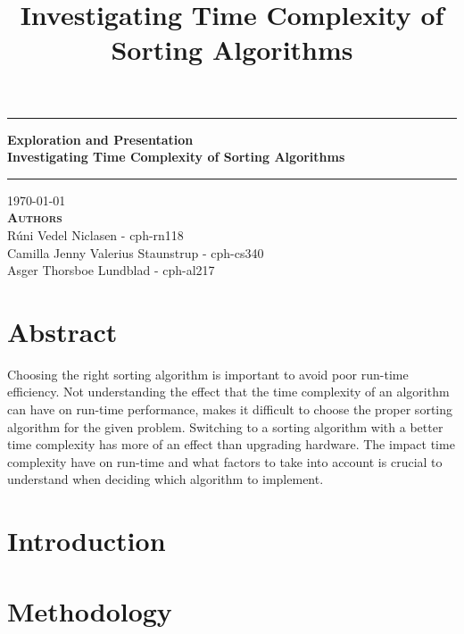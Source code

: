 \documentclass[10pt,oneside,a4paper, english]{article}
\title{Investigating Time Complexity of Sorting Algorithms}
\begin{document}
% 

\begin{center}
\hrule
\vspace{.5cm}
{ \huge \bfseries Exploration and Presentation 
\\ 
\vspace{.5cm}
Investigating Time Complexity of Sorting Algorithms} 
\vspace{.5cm}
\hrule
\vspace{1cm}
\centering \today\\
\vspace{0.5cm}
\textsc{\textbf{Authors}}\\
\centering
Rúni Vedel Niclasen - cph-rn118\\
Camilla Jenny Valerius Staunstrup - cph-cs340\\
Asger Thorsboe Lundblad - cph-al217\\

\end{center}
\section*{Abstract} \label{abstract}
Choosing the right sorting algorithm is important to avoid poor run-time efficiency. Not understanding the effect that the time complexity of an algorithm can have on run-time performance, makes it difficult to choose the proper sorting algorithm for the given problem. Switching to a sorting algorithm with a better time complexity has more of an effect than upgrading hardware. The impact time complexity have on run-time and what factors to take into account is crucial to understand when deciding which algorithm to implement.

\tableofcontents


\newpage
\pagestyle{fancy}

\newpage
\section{Introduction} \label{introduction}
 

\vspace{0.5cm}
\section{Methodology} \label{methodology}
 
\end{document}

